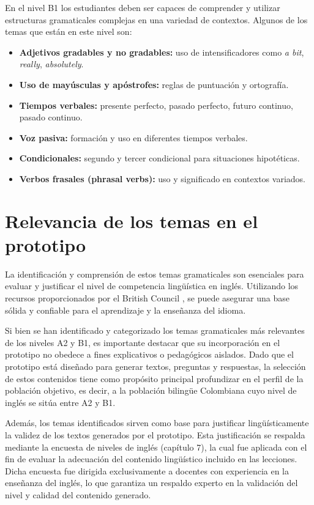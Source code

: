 En el nivel B1 \cite{britishb1b2grammar}los estudiantes deben ser capaces de comprender y utilizar estructuras gramaticales complejas en una variedad de contextos. Algunos de los temas que están en este nivel son:

\begin{itemize}[leftmargin=*, label=--]
    \item \textbf{Adjetivos gradables y no gradables:} uso de intensificadores como \textit{a bit}, \textit{really}, \textit{absolutely}.
    \item \textbf{Uso de mayúsculas y apóstrofes:} reglas de puntuación y ortografía.
    \item \textbf{Tiempos verbales:} presente perfecto, pasado perfecto, futuro continuo, pasado continuo.
    \item \textbf{Voz pasiva:} formación y uso en diferentes tiempos verbales.
    \item \textbf{Condicionales:} segundo y tercer condicional para situaciones hipotéticas.
    \item \textbf{Verbos frasales (phrasal verbs):} uso y significado en contextos variados.
\end{itemize}

\section*{Relevancia de los temas en el prototipo}

La identificación y comprensión de estos temas gramaticales son esenciales para evaluar y justificar el nivel de competencia lingüística en inglés. Utilizando los recursos proporcionados por el British Council \cite{britishcouncilgrammar}, se puede asegurar una base sólida y confiable para el aprendizaje y la enseñanza del idioma.

Si bien se han identificado y categorizado los temas gramaticales más relevantes de los niveles A2 y B1, es importante destacar que su incorporación en el prototipo no obedece a fines explicativos o pedagógicos aislados. Dado que el prototipo está diseñado para generar textos, preguntas y respuestas, la selección de estos contenidos tiene como propósito principal profundizar en el perfil de la población objetivo, es decir, a la población bilingüe Colombiana cuyo nivel de inglés se sitúa entre A2 y B1.

Además, los temas identificados sirven como base para justificar lingüísticamente la validez de los textos generados por el prototipo. Esta justificación se respalda mediante la encuesta de niveles de inglés (capítulo 7), la cual fue aplicada con el fin de evaluar la adecuación del contenido lingüístico incluido en las lecciones. Dicha encuesta fue dirigida exclusivamente a docentes con experiencia en la enseñanza del inglés, lo que garantiza un respaldo experto en la validación del nivel y calidad del contenido generado.

